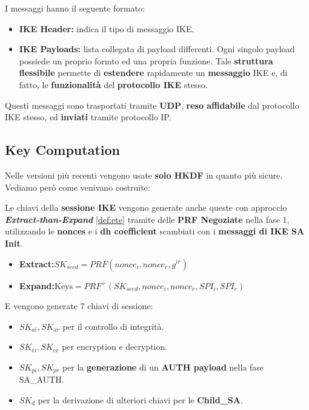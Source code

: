I messaggi hanno il seguente formato:
\begin{definition}\label{def:ikemsg}
\begin{itemize}
    \item \textbf{IKE Header:} indica il tipo di messaggio IKE.
    \item \textbf{IKE Payloads:} lista collegata di payload differenti. Ogni singolo payload possiede un proprio formto ed una propria funzione. Tale \textbf{struttura flessibile} permette di \textbf{estendere} rapidamente un \textbf{messaggio} IKE e, di fatto, le \textbf{funzionalità} del \textbf{protocollo IKE} stesso.
\end{itemize}
\begin{remark}
Questi messaggi sono trasportati tramite \textbf{UDP}, \textbf{reso affidabile} dal protocollo IKE stesso, ed \textbf{inviati} tramite protocollo IP.
\end{remark}
\end{definition}
\subsection{Key Computation}
\begin{remark}
Nelle versioni più recenti vengono usate \textbf{solo HKDF} in quanto più sicure. Vediamo però come venivano costruite:
\end{remark}
Le chiavi della \textbf{sessione IKE} vengono generate anche queste con approccio \textit{\textbf{Extract-than-Expand}} \cref{def:ete} tramite delle \textbf{PRF Negoziate} nella fase 1, utilizzando le \textbf{nonces} e i \textbf{dh coefficient} scambiati con i \textbf{messaggi di IKE SA Init}. 
\begin{definition}
\begin{itemize}
    \item \textbf{Extract:}$SK_{seed}=PRF(nonce_i,nonce_r,g^{ir})$\footnotemark
    \item \textbf{Expand:}$\text{Keys}=PRF^+(SK_{seed},nonce_i,nonce_r,SPI_i,SPI_r)$
\end{itemize}
E vengono generate 7 chiavi di sessione:
\begin{itemize}
    \item $SK_{ai},SK_{ar}$ per il controllo di integrità.
    \item $SK_{ei},SK_{er}$ per encryption e decryption.
    \item $SK_{pi},SK_{pr}$ per la \textbf{generazione} di un \textbf{AUTH payload} nella fase SA\_AUTH.
    \item $SK_{d}$ per la derivazione di ulteriori chiavi per le \textbf{Child\_SA}.
\end{itemize}
\end{definition}
